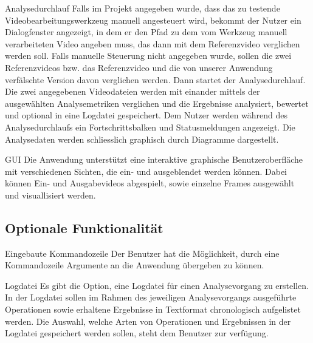 \newItemPF Analysedurchlauf
\newline
Falls im Projekt angegeben wurde, dass das zu testende Videobearbeitungswerkzeug manuell angesteuert wird, 
bekommt der Nutzer ein Dialogfenster angezeigt, in dem er den Pfad zu dem vom Werkzeug manuell verarbeiteten Video angeben muss, das dann mit dem Referenzvideo verglichen werden soll. Falls manuelle Steuerung nicht angegeben wurde, sollen die zwei Referenzvideos bzw. das Referenzvideo und die von unserer Anwendung verfälschte Version davon verglichen werden. Dann startet der Analysedurchlauf. Die zwei angegebenen Videodateien werden mit einander mittels der ausgewählten Analysemetriken verglichen und die Ergebnisse analysiert, bewertet und optional in eine Logdatei gespeichert. Dem Nutzer werden während des Analysedurchlaufs ein Fortschrittsbalken und Statusmeldungen angezeigt. Die Analysedaten werden schliesslich graphisch durch Diagramme dargestellt.

\newItemPF GUI
\newline
Die Anwendung unterstützt eine interaktive graphische Benutzeroberfläche mit verschiedenen Sichten, die ein- und ausgeblendet werden können. Dabei können Ein- und Ausgabevideos abgespielt, sowie einzelne Frames ausgewählt und visuallisiert werden.

\subsection{Optionale Funktionalität}

\newItemPF Eingebaute Kommandozeile
\newline
Der Benutzer hat die Möglichkeit, durch eine Kommandozeile Argumente an die Anwendung übergeben zu können.

\newItemPF Logdatei
\newline
Es gibt die Option, eine Logdatei für einen Analysevorgang zu erstellen. In der Logdatei sollen im Rahmen des jeweiligen Analysevorgangs ausgeführte Operationen sowie erhaltene Ergebnisse in Textformat chronologisch aufgelistet werden. Die Auswahl, welche Arten von Operationen und Ergebnissen in der Logdatei gespeichert werden sollen, steht dem Benutzer zur verfügung.

